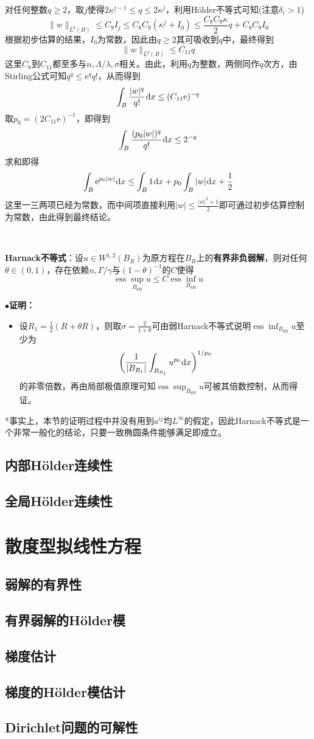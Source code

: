 \documentclass[a4paper,UTF8,fontset=windows,AutoFakeBold]{ctexart}
\newcommand*{\er}{\mathrm{e}}
\newcommand*{\dr}{\hspace{0.07em}\mathrm{d}}
\DeclareMathOperator*{\ess}{ess}
\newcommand{\proo}[1]{{\kaishu $\bullet$\textbf{证明：}
\begin{itemize}
    \item[] #1
\end{itemize}
}}
\begin{document}
{    对任何整数$q\ge2$，取$j$使得$2\kappa^{j-1}\le q\le 2\kappa^j$，利用H\"older不等式可知(注意$\delta_i>1$)
    $$\|w\|_{L^q(B)}\le C_9I_j\le C_8C_9(\kappa^j+I_0)\le\frac{C_8C_9\kappa}{2}q+C_8C_9I_0$$
    根据初步估算的结果，$I_0$为常数，因此由$q\ge2$其可吸收到$q$中，最终得到
    $$\|w\|_{L^q(B)}\le C_{11}q$$
    这里$C_8$到$C_{11}$都至多与$n,\Lambda/\lambda,\sigma$相关。由此，利用$q$为整数，两侧同作$q$次方，由Stirling公式可知$q^q\le\er^qq!$，从而得到
    $$\int_B\frac{|w|^q}{q!}\dr x\le(C_{11}\er)^{-q}$$
    取$p_0=(2C_{11}\er)^{-1}$，即得到
    $$\int_B\frac{(p_0|w|)^q}{q!}\dr x\le2^{-q}$$
    求和即得
    $$\int_B\er^{p_0|w|}\dr x\le\int_B1\dr x+p_0\int_B|w|\dr x+\frac{1}{2}$$
    这里一三两项已经为常数，而中间项直接利用$|w|\le\frac{|w|^2+1}{2}$即可通过初步估算控制为常数，由此得到最终结论。
}

\

\textbf{Harnack不等式}：设$u\in W^{1,2}(B_R)$为原方程在$B_R$上的\textbf{有界非负弱解}，则对任何$\theta\in(0,1)$，存在依赖$n,\Gamma/\gamma$与$(1-\theta)^{-1}$的$C$使得
$$\ess\sup_{B_{\theta R}}u\le C\ess\inf_{B_{\theta R}}u$$
\proo{
    设$R_1=\frac{1}{2}(R+\theta R)$，则取$\sigma=\frac{2}{1+\theta}$可由弱Harnack不等式说明$\ess\inf_{B_{\theta R}}u$至少为
    $$\bigg(\frac{1}{|B_{R_1}|}\int_{B_{R_1}}u^{p_0}\dr x\bigg)^{1/p_0}$$
    的非零倍数，再由局部极值原理可知$\ess\sup_{B_{\theta R}}u$可被其倍数控制，从而得证。
}

*事实上，本节的证明过程中并没有用到$a^{ij}$均$L^\infty$的假定，因此Harnack不等式是一个非常一般化的结论，只要一致椭圆条件能够满足即成立。

\subsection{内部H\"older连续性}
\subsection{全局H\"older连续性}
\section{散度型拟线性方程}
\subsection{弱解的有界性}
\subsection{有界弱解的H\"older模}
\subsection{梯度估计}
\subsection{梯度的H\"older模估计}
\subsection{Dirichlet问题的可解性}
\end{document}
